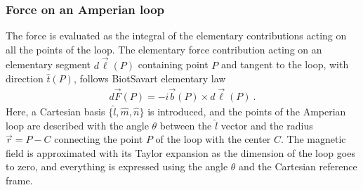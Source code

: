 \documentclass[letterpaper,10pt,english]{jupyterBook}
\begin{document}
\subsubsection*{Force on an Amperian loop}

\sphinxAtStartPar
The force is evaluated as the integral of the elementary contributions acting on all the points of the loop. The elementary force contribution acting on an elementary segment \(d \vec{\ell}(P)\) containing point \(P\) and tangent to the loop, with direction \(\hat{t}(P)\), follows Biot\sphinxhyphen{}Savart elementary law
\begin{equation*}
\begin{split}d \vec{F}(P) = - i \vec{b}(P) \times d \vec{\ell}(P) \ . \end{split}
\end{equation*}
\sphinxAtStartPar
Here, a Cartesian basis \(\{ \hat{l}, \hat{m}, \hat{n}\}\) is introduced, and the points of the Amperian loop are described with the angle \(\theta\) between the \(\hat{l}\) vector and the radius \(\vec{r} = P - C\) connecting the point \(P\) of the loop with the center \(C\). The magnetic field is approximated with its Taylor expansion as the dimension of the loop goes to zero, and everything is expressed using the angle \(\theta\) and the Cartesian reference frame.
\end{document}
